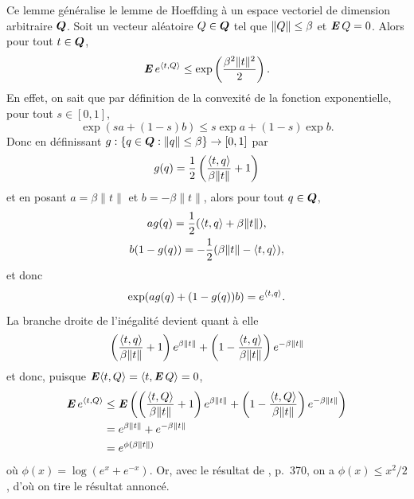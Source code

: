 \begin{lemme}
  \label{b:lem:hoeffding}
  Ce lemme généralise le lemme de Hoeffding à un espace vectoriel de dimension arbitraire
  $\bm Q$. Soit un vecteur aléatoire $Q\in\bm Q$ tel que $\|Q\|\leq\beta$ et $\operatorname{\mbox{\textbf{\textit{E}}}} Q = 0$. Alors pour tout
  $t\in\bm Q$, 
  \begin{equation}
    \operatorname{\mbox{\textbf{\textit{E}}}} e^{\langle t,Q\rangle} \leq \exp\left(\frac{\beta^2\|t\|^2}{2}\right).
  \end{equation}
  En effet, on sait que par définition de la convexité de la fonction exponentielle, pour
  tout $s\in[0,1]$,
  \begin{equation}
    \exp(sa + (1-s)b) \leq s\exp a + (1-s)\exp b.
  \end{equation}
  Donc en définissant $g:\{q \in \bm Q:\|q\|\leq\beta\}\to[0,1]$ par
  \begin{equation}
    g(q) = \frac{1}{2}\left(\frac{\langle t,q\rangle}{\beta\|t\|} + 1\right)
  \end{equation}
  et en posant $a = \beta\|t\|$ et $b = -\beta\|t\|$, alors pour tout $q \in \bm Q$,
  \begin{gather}
    a g(q) = \frac{1}{2}(\langle t,q\rangle + \beta\|t\|),\\
    b (1-g(q)) = - \frac{1}{2}(\beta\|t\| - \langle t,q\rangle),
  \end{gather}
  et donc
  \begin{equation}
    \exp(ag(q) + (1-g(q))b) = e^{\langle t,q\rangle}.
  \end{equation}
  La branche droite de l'inégalité devient quant à elle
  \begin{equation}
    \left(\frac{\langle t,q\rangle}{\beta\|t\|} + 1\right)e^{\beta\|t\|} + \left(1-\frac{\langle t,q\rangle}{\beta\|t\|}\right)e^{-\beta\|t\|}
  \end{equation}
  et donc, puisque $\operatorname{\mbox{\textbf{\textit{E}}}}\langle t,Q\rangle = \langle t,\operatorname{\mbox{\textbf{\textit{E}}}} Q\rangle = 0$, 
  \begin{align}
    \operatorname{\mbox{\textbf{\textit{E}}}} e^{\langle t,Q\rangle} &\leq \operatorname{\mbox{\textbf{\textit{E}}}}\left(\left(\frac{\langle t,Q\rangle}{\beta\|t\|} + 1\right)e^{\beta\|t\|} +
                       \left(1-\frac{\langle t,Q\rangle}{\beta\|t\|}\right)e^{-\beta\|t\|}\right)\\
                     &= e^{\beta\|t\|} + e^{-\beta\|t\|}\\
                     &= e^{\phi(\beta\|t\|)}
  \end{align}
  où $\phi(x) = \log(e^{x} + e^{-x})$. Or, avec le résultat de \cite{mohri2012foundations},
  p.~370, on a $\phi(x) \leq x^2/2$, d'où on tire le résultat annoncé.
\end{lemme}

